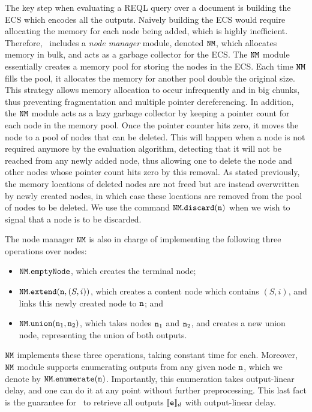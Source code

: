 The key step when evaluating a REQL query over a document is building the ECS
which encodes all the outputs. Naively building the ECS would require allocating
the memory for each node being added, which is highly inefficient. Therefore,
\rematch\ includes a \emph{node manager} module, denoted $\mathtt{NM}$, which allocates
memory in bulk, and acts as a garbage collector for the ECS. The $\mathtt{NM}$ module
essentially creates a memory pool for storing the nodes in the ECS. Each time
$\mathtt{NM}$ fills the pool, it allocates the memory for another pool double the
original size. This strategy allows memory allocation to occur infrequently and
in big chunks, thus preventing fragmentation and multiple pointer dereferencing.
In addition, the $\mathtt{NM}$ module acts as a lazy garbage collector by keeping a
pointer count for each node in the memory pool. Once the pointer counter hits
zero, it moves the node to a pool of nodes that can be deleted. This will happen
when a node is not required anymore by the evaluation algorithm, detecting that
it will not be reached from any newly added node, thus allowing one to delete
the node and other nodes whose pointer count hits zero by this removal.
As stated previously, the memory locations of deleted nodes are not freed but
are instead overwritten by newly created nodes, in which case these locations
are removed from the pool of nodes to be deleted. We use the command
$\mathtt{NM}.\texttt{discard}(\mathtt{n})$ when we wish to signal that a node is to be
discarded.


The node manager $\mathtt{NM}$ is also in charge of implementing the following three
operations over nodes:
\begin{itemize}
	\item $\mathtt{NM}.\texttt{emptyNode}$, which creates the terminal node;
	\item $\mathtt{NM}.\texttt{extend}(\mathtt{n},(S,i))$, which creates a content node which
	contains $(S,i)$, and links this newly created node to $\mathtt{n}$; and
	\item $\mathtt{NM}.\texttt{union}(\mathtt{n}_1,\mathtt{n}_2)$, which takes nodes $\mathtt{n}_1$ and
	$\mathtt{n}_2$, and creates a new union node, representing the union of both
	outputs.
\end{itemize}
$\mathtt{NM}$ implements these three operations, taking constant time for each.
Moreover, $\mathtt{NM}$ module supports enumerating outputs from any given node $\mathtt{n}$,
which we denote by $\mathtt{NM}.\texttt{enumerate}(\mathtt{n})$. Importantly, this enumeration takes
output-linear delay, and one can do it at any point without further
preprocessing. This last fact is the guarantee for \rematch\ to retrieve all
outputs $\llbracket\texttt{e}\rrbracket_d$ with output-linear delay. 

